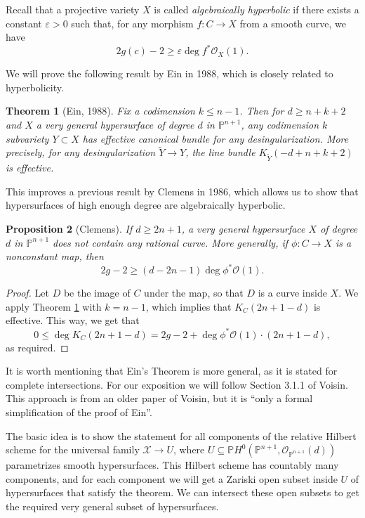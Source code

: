\documentclass[leqno, openany]{memoir}
\newtheorem{thm}{Theorem}[section]
\newtheorem{prop}[thm]{Proposition}
\theoremstyle{definition}
\theoremstyle{remark}
\theoremstyle{plain}
\theoremstyle{definition}
\theoremstyle{remark}
\renewcommand{\P}{\mathbb{P}}
\newcommand{\mc}[1]{\mathcal{#1}}
\begin{document}
Recall that a projective variety $X$ is called \textit{algebraically hyperbolic} if there exists a constant $\varepsilon>0$ such that, for any morphism $f\colon C \to X$ from a smooth curve, we have
\[ 2g(c)-2 \geq \varepsilon \deg f^\ast \mc{O}_X(1). \]

We will prove the following result by Ein in 1988, which is closely related to hyperbolicity. 

\begin{thm}[Ein, 1988] \label{thm:ein}
Fix a codimension $k \leq n-1$. Then for $d \geq n+k+2$ and $X$ a very general hypersurface of degree $d$ in $\P^{n+1}$, any codimension $k$ subvariety $Y \subset X$ has effective canonical bundle for any desingularization. More precisely, for any desingularization $\tilde{Y} \to Y$, the line bundle $K_{\tilde{Y}}(-d+n+k+2)$ is effective. 
\end{thm}

This improves a previous result by Clemens in 1986, which allows us to show that hypersurfaces of high enough degree are algebraically hyperbolic.

\begin{prop}[Clemens] 
If $d \geq 2n+1$, a very general hypersurface $X$ of degree $d$ in $\P^{n+1}$ does not contain any rational curve. More generally, if $\phi\colon C \to X$ is a nonconstant map, then 
    \[ 2g-2 \geq (d-2n-1) \deg \phi^\ast \mc{O}(1). \]
\end{prop}

\begin{proof}
Let $D$ be the image of $C$ under the map, so that $D$ is a curve inside $X$. We apply Theorem \ref{thm:ein} with $k=n-1$, which implies that $K_C(2n+1-d)$ is effective. This way, we get that
    \[ 0 \leq \deg K_C(2n+1-d) = 2g-2+\deg \phi^\ast \mc{O}(1) \cdot (2n+1-d), \]
as required. 
\end{proof}

It is worth mentioning that Ein's Theorem is more general, as it is stated for complete intersections. For our exposition we will follow Section 3.1.1 of Voisin. This approach is from an older paper of Voisin, but it is ``only a formal simplification of the proof of Ein''.

The basic idea is to show the statement for all components of the relative Hilbert scheme for the universal family $\mc{X} \to U$, where $U \subseteq \P H^0(\P^{n+1}, \mc{O}_{\P^{n+1}}(d))$ parametrizes smooth hypersurfaces. This Hilbert scheme has countably many components, and for each component we will get a Zariski open subset inside $U$ of hypersurfaces that satisfy the theorem. We can intersect these open subsets to get the required very general subset of hypersurfaces.
\end{document}
